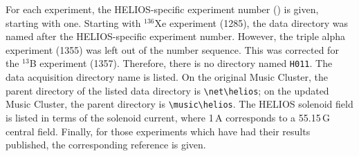 For each experiment, the HELIOS-specific experiment number (\astrosun) is given, starting with one.
Starting with $^{136}$Xe experiment (1285), the data directory was named after the HELIOS-specific experiment number.
However, the triple alpha experiment (1355) was left out of the number sequence.
This was corrected for the $^{13}$B experiment (1357).
Therefore, there is no directory named \texttt{H011}.
The data acquisition directory name is listed.
On the original Music Cluster, the parent directory of the listed data directory is \verb|\net\helios|; on the updated Music Cluster, the parent directory is \verb|\music\helios|.
The HELIOS solenoid field is listed in terms of the solenoid current, where 1\,A corresponds to a 55.15\,G central field.
Finally, for those experiments which have had their results published, the corresponding reference is given.
